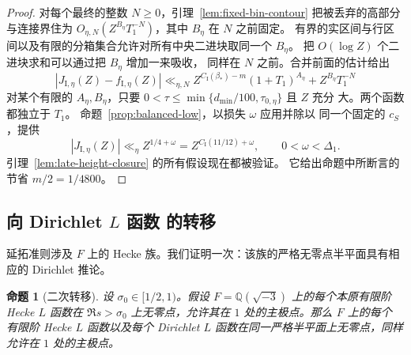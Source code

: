 \documentclass[11pt,a4paper]{article}
\numberwithin{equation}{section}
\numberwithin{figure}{section}
\newtheorem{proposition}[theorem]{命题}
\theoremstyle{definition}
\theoremstyle{remark}
\begin{document}
\begin{proof}
对每个最终的整数 $N\ge0$，引理~\ref{lem:fixed-bin-contour}
把被丢弃的高部分与连接界住为
$O_{\eta,N}(Z^{B_\eta}T_1^{-N})$，其中 $B_\eta$ 在 $N$ 之前固定。
有界的实区间与行区间以及有限的分箱集合允许对所有中央二进块取同一个
$B_\eta$。
把 $O(\log Z)$ 个二进块求和可以通过把 $B_\eta$ 增加一来吸收，
同样在 $N$ 之前。合并前面的估计给出
\[
 |J_{\mathrm I,\eta}(Z)-f_{\mathrm I,\eta}(Z)|
 \ll_{\eta,N}Z^{C_{\mathrm I}(\beta_*)-m}(1+T_1)^{A_\eta}
       +Z^{B_\eta}T_1^{-N}
\]
对某个有限的 $A_\eta,B_\eta$，只要
$0<\tau\le\min\{d_{\min}/100,\tau_{0,\eta}\}$ 且 $Z$ 充分
大。两个函数都独立于 $T_1$。
命题~\ref{prop:balanced-low}，以损失 $\omega$ 应用并除以
同一个固定的 $c_S$，提供
\[
 |J_{\mathrm I,\eta}(Z)|\ll_\eta
 Z^{1/4+\omega}=Z^{C_{\mathrm I}(11/12)+\omega},
 \qquad 0<\omega<\Delta_1.
\]
引理~\ref{lem:late-height-closure} 的所有假设现在都被验证。
它给出命题中所断言的节省 $m/2=1/4800$。
\end{proof}

\subsection{向 Dirichlet \texorpdfstring{$L$ 函数}{L-functions} 的转移}

延拓准则涉及 $F$ 上的 Hecke 族。我们证明一次：该族的严格无零点半平面具有相应的 Dirichlet 推论。

\begin{proposition}[二次转移]
\label{prop:hecke-dirichlet-transfer}
设 $\sigma_0\in[1/2,1)$。假设 $F=\mathbb Q(\sqrt{-3})$ 上的每个本原有限阶 Hecke
$L$ 函数在 $\Re s>\sigma_0$ 上无零点，允许其在 $1$ 处的主极点。那么 $F$ 上的每个
有限阶 Hecke $L$ 函数以及每个 Dirichlet $L$ 函数在同一严格半平面上无零点，同样
允许在 $1$ 处的主极点。
\end{proposition}
\end{document}
